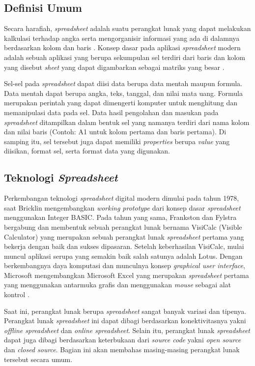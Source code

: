 \subsection{Definisi Umum}
Secara harafiah, \textit{spreadsheet} adalah suatu perangkat lunak yang dapat melakukan kalkulasi terhadap angka serta mengorganisir informasi yang ada di dalamnya berdasarkan kolom dan baris \citep{meriamwebster-spreadsheet}. Konsep dasar pada aplikasi \textit{spreadsheet} modern adalah sebuah aplikasi yang berupa sekumpulan sel terdiri dari baris dan kolom yang disebut \textit{sheet} yang dapat digambarkan sebagai matriks yang besar \citep{Ronen1989}.

Sel-sel pada \textit{spreadsheet} dapat diisi data berupa data mentah maupun formula. Data mentah dapat berupa angka, teks, tanggal, dan nilai mata uang. Formula merupakan perintah yang dapat dimengerti komputer untuk menghitung dan memanipulasi data pada sel. Data hasil pengolahan dan masukan pada \textit{spreadsheet} ditampilkan dalam bentuk sel yang namanya terdiri dari nama kolom dan nilai baris (Contoh: A1 untuk kolom pertama dan baris pertama). Di samping itu, sel tersebut juga dapat memiliki \textit{properties} berupa \textit{value} yang diisikan, format sel, serta format data yang digunakan.

\subsection{Teknologi \textit{Spreadsheet}} \label{TeknologiSpreadsheet}
Perkembangan teknologi \textit{spreadsheet} digital modern dimulai pada tahun 1978, saat Bricklin mengembangkan \textit{working prototype} dari konsep dasar \textit{spreadsheet} menggunakan Integer BASIC. Pada tahun yang sama, Frankston dan Fylstra bergabung dan membentuk sebuah perangkat lunak bernama VisiCalc (Visible Calculator) yang merupakan sebuah perangkat lunak \textit{spreadsheet} pertama yang bekerja dengan baik dan sukses dipasaran. Setelah keberhasilan VisiCalc, mulai muncul aplikasi serupa yang semakin baik salah satunya adalah Lotus. Dengan berkembangnya daya komputasi dan munculnya konsep \textit{graphical user interface}, Microsoft mengembangkan Microsoft Excel yang merupakan \textit{spreadsheet} pertama yang menggunakan antarmuka grafis dan menggunakan \textit{mouse} sebagai alat kontrol \citep{power2004brief}.

Saat ini, perangkat lunak berupa \textit{spreadsheet} sangat banyak variasi dan tipenya. Perangkat lunak \textit{spreadsheet} ini dapat dibagi berdasarkan konektivitasnya yakni \textit{offline spreadsheet} dan \textit{online spreadsheet}. Selain itu, perangkat lunak \textit{spreadsheet} dapat juga dibagi berdasarkan keterbukaan dari \textit{source code} yakni \textit{open source} dan \textit{closed source}. Bagian ini akan membahas masing-masing perangkat lunak tersebut secara umum.

